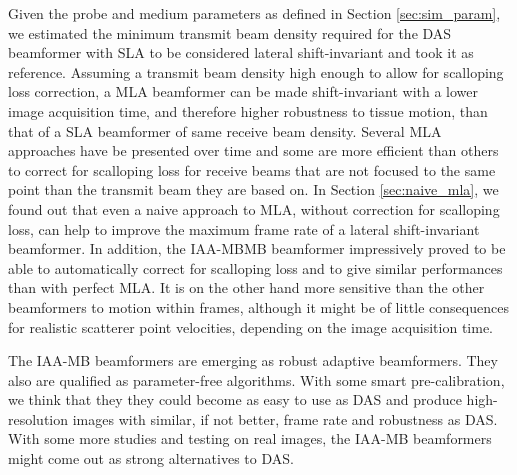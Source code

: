 Given the probe and medium parameters as defined in Section \ref{sec:sim_param}, we estimated the minimum transmit beam density required for the DAS beamformer with SLA to be considered lateral shift-invariant and took it as reference.
Assuming a transmit beam density high enough to allow for scalloping loss correction, a MLA beamformer can be made shift-invariant with a lower image acquisition time, and therefore higher robustness to tissue motion, than that of a SLA beamformer of same receive beam density.
Several MLA approaches have be presented over time and some are more efficient than others to correct for scalloping loss for receive beams that are not focused to the same point than the transmit beam they are based on.
In Section \ref{sec:naive_mla}, we found out that even a naive approach to MLA, without correction for scalloping loss, can help to improve the maximum frame rate of a lateral shift-invariant beamformer.
In addition, the IAA-MBMB beamformer impressively proved to be able to automatically correct for scalloping loss and to give similar performances than with perfect MLA.
It is on the other hand more sensitive than the other beamformers to motion within frames, although it might be of little consequences for realistic scatterer point velocities, depending on the image acquisition time.

The IAA-MB beamformers are emerging as robust adaptive beamformers.
They also are qualified as parameter-free algorithms. With some smart pre-calibration, we think that they they could become as easy to use as DAS and produce high-resolution images with similar, if not better, frame rate and robustness as DAS.
With some more studies and testing on real images, the IAA-MB beamformers might come out as strong alternatives to DAS.

